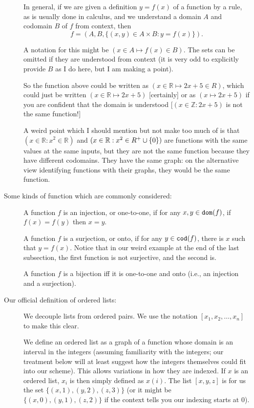 \documentclass[12pt]{article}
\begin{document}
\begin{description}
In general, if we are given a definition $y = f(x)$ of a function by a rule, as is usually done in calculus, and we understand a domain $A$ and codomain $B$ of $f$ from context,
then $$f=(A,B,\{(x,y) \in A \times B:y=f(x)\}).$$

A notation for this might be $(x\in A \mapsto f(x)\in B)$.  The sets can be omitted if they are understood from context (it is very odd to explicitly provide $B$ as I do here, but I am making a point).

So the function above could be written as $(x \in \mathbb R \mapsto 2x+5 \in R)$, which could just be written $(x \in \mathbb R \mapsto 2x+5)$ [certainly] or as
$(x \mapsto 2x+5)$ if you are confident that the domain is understood [$(x \in \mathbb Z:2x+5)$ is not the same function!]

A weird point which I should mention but not make too much of is that $(x \in {\mathbb R}:x^2 \in \mathbb R)$ and $(x \in {\mathbb R}:x^2 \in \mathbb \mathbb R^+ \cup \{0\})$ are functions with the same values at the same inputs, but they are not the same function because they have different codomains.  They have the same graph:  on the alternative view identifying functions with their graphs, they would be the same function.





\item[Some kinds of function which are commonly considered:]

A function $f$ is an injection, or one-to-one, if for any $x,y \in {\tt dom}(f)$, if $f(x)=f(y)$ then $x=y$.

A function $f$ is a surjection, or onto, if for any $y \in {\tt cod}(f)$, there is $x$ such that $y = f(x)$.  Notice that in our weird example at the end of the last subsection, the first function is not surjective, and the second is.

A function $f$ is a bijection iff it is one-to-one and onto (i.e., an injection and a surjection).

\item[Our official definition of ordered lists:]  We decouple lists from ordered pairs.  We use the notation
$[x_1,x_2,\ldots,x_n]$ to make this clear.

We define an ordered list as a graph of a function whose domain is an interval in the integers (assuming familiarity with the integers;  our treatment below will at least suggest how the integers themselves could fit into our scheme).  This allows variations in how
they are indexed.  If $x$ is an ordered list, $x_i$ is then simply defined as $x(i)$.  The list $[x,y,z]$ is for us
the set $\{(x,1),(y,2),(z,3)\}$ (or it might be $\{(x,0),(y,1),(z,2)\}$ if the context tells you our indexing starts at 0).


\end{description}
\end{document}
